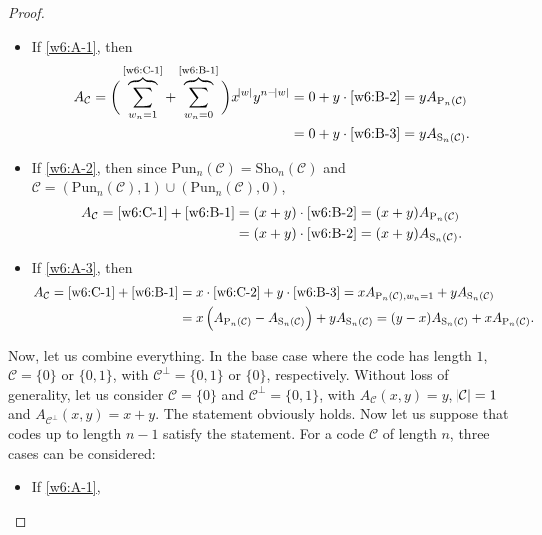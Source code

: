 \begin{proof}
    \begin{itemize}
        \item If \ref{w6:A-1}, then
        \begin{align*}
            A_\mathcal{C} = \bigg(\overbrace{\sum_{w_n=1}}^{\text{\ref{w6:C-1}}}+\overbrace{\sum_{w_n=0}}^{\text{\ref{w6:B-1}}}\bigg) x^{\abs{w}}y^{n-\abs{w}} &= 0 + y\cdot \text{\ref{w6:B-2}} = y A_{\mathrm{P}_n(\mathcal{C})} \\
            &= 0 + y\cdot \text{\ref{w6:B-3}} = y A_{\mathrm{S}_n(\mathcal{C})}.
        \end{align*}
        \item If \ref{w6:A-2}, then since $\mathrm{Pun}_n(\mathcal{C}) = \mathrm{Sho}_n(\mathcal{C})$ and $\mathcal{C} = \left(\mathrm{Pun}_n(\mathcal{C}),1\right) \cup \left(\mathrm{Pun}_n(\mathcal{C}),0\right)$,
        \begin{align*}
            A_\mathcal{C} = \text{\ref{w6:C-1}} + \text{\ref{w6:B-1}} &= (x+y)\cdot \text{\ref{w6:B-2}} = (x+y) A_{\mathrm{P}_n(\mathcal{C})}\\
            &= (x+y)\cdot \text{\ref{w6:B-2}} = (x+y) A_{\mathrm{S}_n(\mathcal{C})}.
        \end{align*}
        \item If \ref{w6:A-3}, then
        \begin{align*}
            A_\mathcal{C} = \text{\ref{w6:C-1}} + \text{\ref{w6:B-1}} &= x\cdot\text{\ref{w6:C-2}} + y\cdot\text{\ref{w6:B-3}} = x A_{\mathrm{P}_n(\mathcal{C}),w_n=1} + y A_{\mathrm{S}_n(\mathcal{C})}\\
            &= x \left(A_{\mathrm{P}_n(\mathcal{C})} - A_{\mathrm{S}_n(\mathcal{C})}\right) + y A_{\mathrm{S}_n(\mathcal{C})} = (y-x) A_{\mathrm{S}_n(\mathcal{C})} + x A_{\mathrm{P}_n(\mathcal{C})}.
        \end{align*}
    \end{itemize}
    Now, let us combine everything. In the base case where the code has length $1$, $\mathcal{C}=\{0\}$ or $\{0,1\}$, with $\mathcal{C}^\perp=\{0,1\}$ or $\{0\}$, respectively. Without loss of generality, let us consider $\mathcal{C}=\{0\}$ and $\mathcal{C}^\perp=\{0,1\}$, with $A_\mathcal{C}(x,y)=y$, $\abs{\mathcal{C}}=1$ and $A_{\mathcal{C}^\perp}(x,y)=x+y$. The statement obviously holds. Now let us suppose that codes up to length $n-1$ satisfy the statement. For a code $\mathcal{C}$ of length $n$, three cases can be considered:
    \begin{itemize}
        \item If \ref{w6:A-1},

\end{itemize}
\end{proof}
